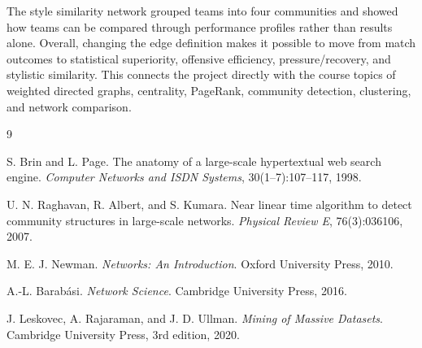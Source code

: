 \documentclass[10pt,twocolumn]{article}
\begin{document}
The style similarity network grouped teams into four communities and showed how teams can be compared through performance profiles rather than results alone. Overall, changing the edge definition makes it possible to move from match outcomes to statistical superiority, offensive efficiency, pressure/recovery, and stylistic similarity. This connects the project directly with the course topics of weighted directed graphs, centrality, PageRank, community detection, clustering, and network comparison.

\begin{thebibliography}{9}

S. Brin and L. Page.
\newblock The anatomy of a large-scale hypertextual web search engine.
\newblock \emph{Computer Networks and ISDN Systems}, 30(1--7):107--117, 1998.

U. N. Raghavan, R. Albert, and S. Kumara.
\newblock Near linear time algorithm to detect community structures in large-scale networks.
\newblock \emph{Physical Review E}, 76(3):036106, 2007.

M. E. J. Newman.
\newblock \emph{Networks: An Introduction}.
\newblock Oxford University Press, 2010.

A.-L. Barabási.
\newblock \emph{Network Science}.
\newblock Cambridge University Press, 2016.

J. Leskovec, A. Rajaraman, and J. D. Ullman.
\newblock \emph{Mining of Massive Datasets}.
\newblock Cambridge University Press, 3rd edition, 2020.

\end{thebibliography}
\end{document}
